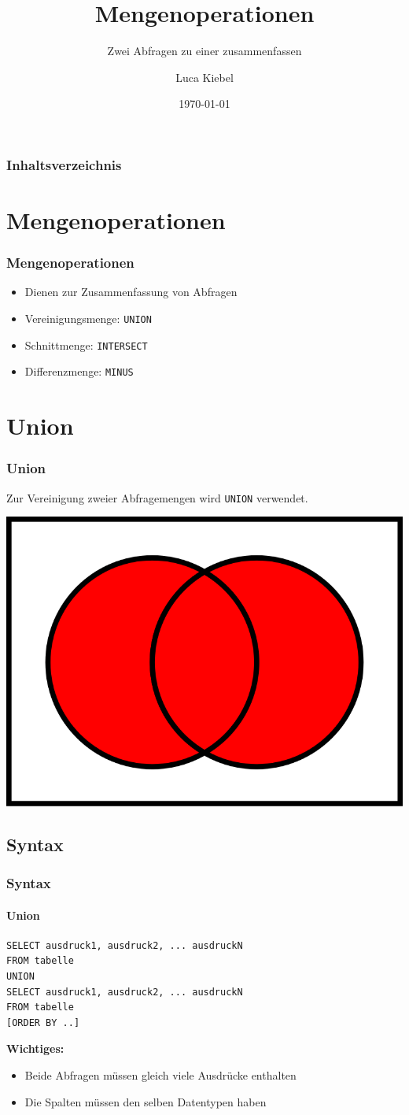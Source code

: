 \documentclass[10pt,a4paper]{beamer}
\author{Luca Kiebel}
\title{Mengenoperationen}
\subtitle{Zwei Abfragen zu einer zusammenfassen}
\date{\today}
\begin{document}
\begin{frame}
\titlepage
\end{frame}

\begin{frame}
\frametitle{Inhaltsverzeichnis}\tableofcontents
\end{frame}

\section{Mengenoperationen}
\begin{frame}
\frametitle{Mengenoperationen}
\begin{itemize}
\item Dienen zur Zusammenfassung von Abfragen
\pause
\item Vereinigungsmenge: \lstinline|UNION|
\pause
\item Schnittmenge: \lstinline|INTERSECT|
\pause
\item Differenzmenge: \lstinline|MINUS|
\end{itemize}
\end{frame}

\section{Union}
\begin{frame}
\frametitle{Union}
Zur Vereinigung zweier Abfragemengen wird \lstinline|UNION| verwendet.
\newline
\begin{center}
\includegraphics[width=0.5\linewidth]{vereinigungsmenge}
\end{center}
\end{frame}

\subsection{Syntax}
\begin{frame}[fragile]
\frametitle{Syntax}
\framesubtitle{Union}
\begin{lstlisting}
SELECT ausdruck1, ausdruck2, ... ausdruckN
FROM tabelle
UNION
SELECT ausdruck1, ausdruck2, ... ausdruckN
FROM tabelle
[ORDER BY ..]
\end{lstlisting}
\pause
\textbf{Wichtiges:}
\begin{itemize}
\item Beide Abfragen müssen gleich viele Ausdrücke enthalten
\item Die Spalten müssen den selben Datentypen haben 
\end{itemize}
\end{frame}
\end{document}
